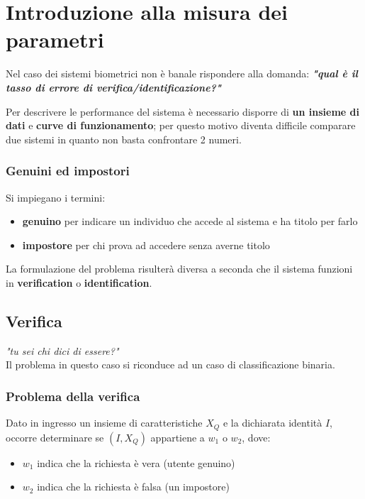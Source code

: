 \section{Introduzione alla misura dei parametri}
Nel caso dei sistemi biometrici non è banale rispondere alla domanda: \textit{\textbf{
    "qual è il tasso di errore di verifica/identificazione?"
}}

Per descrivere le performance del sistema è necessario disporre di \textbf{un insieme di dati} e \textbf{curve di funzionamento};
per questo motivo diventa difficile comparare due sistemi in quanto non basta confrontare 2 numeri.

\subsubsection{Genuini ed impostori}

Si impiegano i termini:
\begin{itemize}
    \item \textbf{genuino} per indicare un individuo che accede al sistema e ha titolo per farlo
    \item \textbf{impostore} per chi prova ad accedere senza averne titolo
\end{itemize}

La formulazione del problema risulterà diversa a seconda che il sistema funzioni in \textbf{verification} o \textbf{identification}.

\newpage

\subsection{Verifica}

\textit{"tu sei chi dici di essere?"}
\\
Il problema in questo caso si riconduce ad un caso di classificazione binaria.

\subsubsection{Problema della verifica}

Dato in ingresso un insieme di caratteristiche $X_Q$ e la dichiarata identità $I$,
occorre determinare se $(I, X_Q)$ appartiene a $w_1$ o $w_2$, dove:
\begin{itemize}
    \item $w_1$ indica che la richiesta è vera (utente genuino)
    \item $w_2$ indica che la richiesta è falsa (un impostore)
\end{itemize}

